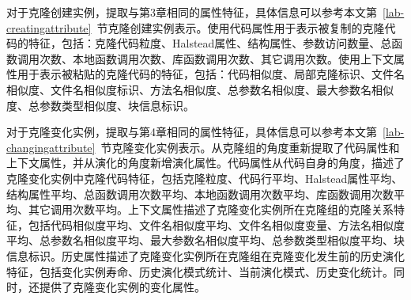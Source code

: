 对于克隆创建实例，提取与第3章相同的属性特征，具体信息可以参考本文第~\ref{lab-creatingattribute}~节克隆创建实例表示。使用代码属性用于表示被复制的克隆代码的特征，包括：克隆代码粒度、Halstead属性、结构属性、参数访问数量、总函数调用次数、本地函数调用次数、库函数调用次数、其它调用次数。使用上下文属性用于表示被粘贴的克隆代码的特征，包括：代码相似度、局部克隆标识、文件名相似度、文件名相似度标识、方法名相似度、总参数名相似度、最大参数名相似度、总参数类型相似度、块信息标识。

对于克隆变化实例，提取与第4章相同的属性特征，具体信息可以参考本文第~\ref{lab-changingattribute}~节克隆变化实例表示。从克隆组的角度重新提取了代码属性和上下文属性，并从演化的角度新增演化属性。代码属性从代码自身的角度，描述了克隆变化实例中克隆代码特征，包括克隆粒度、代码行平均、Halstead属性平均、结构属性平均、总函数调用次数平均、本地函数调用次数平均、库函数调用次数平均、其它调用次数平均。上下文属性描述了克隆变化实例所在克隆组的克隆关系特征，包括代码相似度平均、文件名相似度平均、文件名相似度变量、方法名相似度平均、总参数名相似度平均、最大参数名相似度平均、总参数类型相似度平均、块信息标识。历史属性描述了克隆变化实例所在克隆组在克隆变化发生前的历史演化特征，包括变化实例寿命、历史演化模式统计、当前演化模式、历史变化统计。同时，还提供了克隆变化实例的变化属性。


